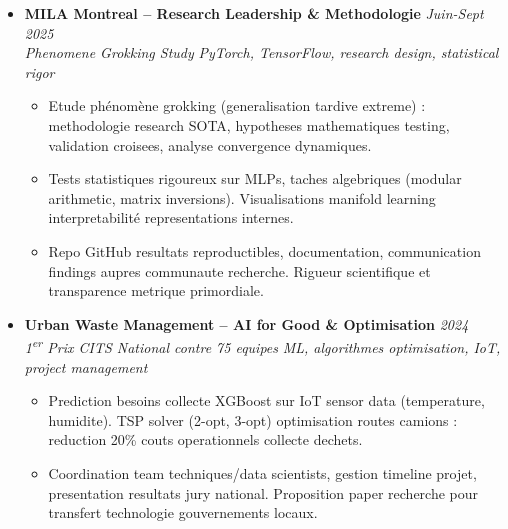 \documentclass[a4paper,11pt]{article}
\begin{document}
\begin{itemize}[leftmargin=*, label={-}]
\item \textbf{MILA Montreal -- Research Leadership \& Methodologie} \hfill \textit{Juin-Sept 2025} \\
\textit{Phenomene Grokking Study} \hfill \textit{PyTorch, TensorFlow, research design, statistical rigor}
\vspace{-2pt}
    \begin{itemize}[leftmargin=0.4cm, nosep, label=\tiny$\bullet$]
        \item \small{Etude phénomène grokking (generalisation tardive extreme) : methodologie research SOTA, hypotheses mathematiques testing, validation croisees, analyse convergence dynamiques.}
        \item \small{Tests statistiques rigoureux sur MLPs, taches algebriques (modular arithmetic, matrix inversions). Visualisations manifold learning interpretabilité representations internes.}
        \item \small{Repo GitHub resultats reproductibles, documentation, communication findings aupres communaute recherche. Rigueur scientifique et transparence metrique primordiale.}
    \end{itemize}
\vspace{3pt}

\item \textbf{Urban Waste Management -- AI for Good \& Optimisation} \hfill \textit{2024} \\
\textit{1\textsuperscript{er} Prix CITS National contre 75 equipes} \hfill \textit{ML, algorithmes optimisation, IoT, project management}
\vspace{-2pt}
    \begin{itemize}[leftmargin=0.4cm, nosep, label=\tiny$\bullet$]
        \item \small{Prediction besoins collecte XGBoost sur IoT sensor data (temperature, humidite). TSP solver (2-opt, 3-opt) optimisation routes camions : reduction 20\% couts operationnels collecte dechets.}
        \item \small{Coordination team techniques/data scientists, gestion timeline projet, presentation resultats jury national. Proposition paper recherche pour transfert technologie gouvernements locaux.}
    \end{itemize}
\vspace{3pt}


\end{itemize}
\end{document}
